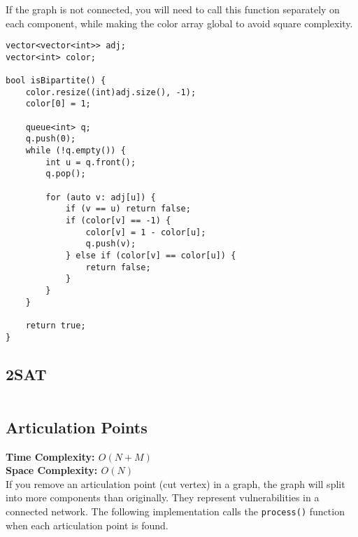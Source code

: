\begin{remark}
  If the graph is not connected, you will need to call this function
separately on each component, while making the color array global
to avoid square complexity.
\end{remark}

\begin{lstlisting}
vector<vector<int>> adj;
vector<int> color;

bool isBipartite() {
    color.resize((int)adj.size(), -1);
    color[0] = 1;
 
    queue<int> q;
    q.push(0);
    while (!q.empty()) {
        int u = q.front();
        q.pop();
 
        for (auto v: adj[u]) {
            if (v == u) return false;
            if (color[v] == -1) {
                color[v] = 1 - color[u];
                q.push(v);
            } else if (color[v] == color[u]) {
                return false;
            }
        }
    }
 
    return true;
}
\end{lstlisting}

\newpage

\subsection{2SAT}

\hrulefill \vspace{-\baselineskip}
\begin{multicols}{2}
\inputminted[autogobble,fontsize=\footnotesize]{C++}{Graphs/2sat.cpp}
\end{multicols}
\vspace{-\baselineskip}
\noindent \hrulefill

\newpage

\subsection{Articulation Points}

\textbf{Time Complexity: $O(N + M)$}\\
\textbf{Space Complexity: $O(N)$}\\

If you remove an articulation point (cut vertex) in a graph,
the graph will split into more components than originally.
They represent vulnerabilities in a connected network.
The following implementation \cite{CutPointsCPAlgo}
calls the \lstinline{process()} function when each articulation
point is found. 


